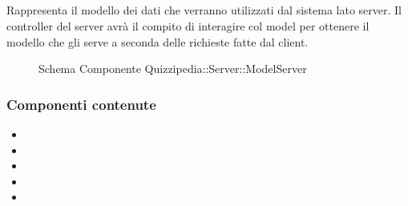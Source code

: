 \subsection{}
Rappresenta il modello dei dati che verranno utilizzati dal sistema lato server. 
Il controller del server avrà il compito di interagire col model per ottenere il modello che gli serve a seconda delle richieste fatte dal client.
\begin{figure}[H]
\centering
\noindent{}
\caption[Schema Componente Quizzipedia::Server::ModelServer]{Schema Componente Quizzipedia::Server::ModelServer}
\end{figure}
\subsubsection{Componenti contenute}
\begin{itemize}
\item {}
\item {}
\item {}
\item {}
\item {}
\end{itemize}
